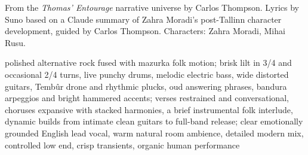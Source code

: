 
\begin{notes}
From the \emph{Thomas' Entourage} narrative universe by Carlos Thompson. Lyrics by Suno based on a Claude summary of Zahra Moradi's post-Tallinn character development, guided by Carlos Thompson. Characters: Zahra Moradi, Mihai Rusu.
\end{notes}
\begin{style}
polished alternative rock fused with mazurka folk motion; brisk lilt in 3/4 and occasional 2/4 turns, live punchy drums, melodic electric bass, wide distorted guitars, Tembûr drone and rhythmic plucks, oud answering phrases, bandura arpeggios and bright hammered accents; verses restrained and conversational, choruses expansive with stacked harmonies, a brief instrumental folk interlude, dynamic builds from intimate clean guitars to full-band release; clear emotionally grounded English lead vocal, warm natural room ambience, detailed modern mix, controlled low end, crisp transients, organic human performance
\end{style}
